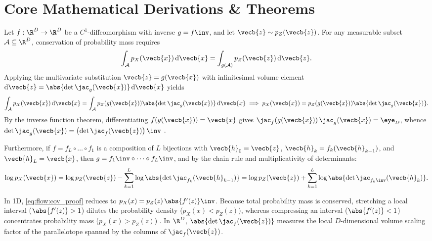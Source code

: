 \documentclass[../../../../master.tex]{subfiles}
\begin{document}
\section{Core Mathematical Derivations \& Theorems}\label{sec:flow:derivations}

\begin{coremath}
Let $f : \R^D \to \R^D$ be a $C^1$-diffeomorphism with inverse $g = f\inv$, and let $\vecb{z} \sim p_Z(\vecb{z})$. For any measurable subset $\mathcal{A} \subseteq \R^D$, conservation of probability mass requires
\begin{equation}\label{eq:flow:mass_conservation}
  \int_{\mathcal{A}} p_X(\vecb{x})\,\mathrm{d}\vecb{x} = \int_{g(\mathcal{A})} p_Z(\vecb{z})\,\mathrm{d}\vecb{z}.
\end{equation}
Applying the multivariate substitution $\vecb{z} = g(\vecb{x})$ with infinitesimal volume element $\mathrm{d}\vecb{z} = \abs{\det \jac_g(\vecb{x})}\,\mathrm{d}\vecb{x}$ yields
\begin{equation}\label{eq:flow:cov_proof}
  \int_{\mathcal{A}} p_X(\vecb{x})\,\mathrm{d}\vecb{x} = \int_{\mathcal{A}} p_Z(g(\vecb{x})) \abs{\det \jac_g(\vecb{x})}\,\mathrm{d}\vecb{x} \implies p_X(\vecb{x}) = p_Z(g(\vecb{x})) \abs{\det \jac_g(\vecb{x})}.
\end{equation}
By the inverse function theorem, differentiating $f(g(\vecb{x})) = \vecb{x}$ gives $\jac_f(g(\vecb{x}))\,\jac_g(\vecb{x}) = \eye_D$, whence $\det \jac_g(\vecb{x}) = \left(\det \jac_f(\vecb{z})\right)\inv$ .

Furthermore, if $f = f_L \circ \dots \circ f_1$ is a composition of $L$ bijections with $\vecb{h}_0 = \vecb{z}$, $\vecb{h}_k = f_k(\vecb{h}_{k-1})$, and $\vecb{h}_L = \vecb{x}$, then $g = f_1\inv \circ \dots \circ f_L\inv$, and by the chain rule and multiplicativity of determinants:
\begin{equation}\label{eq:flow:chain_rule}
  \log p_X(\vecb{x}) = \log p_Z(\vecb{z}) - \sum_{k=1}^L \log \abs{\det \jac_{f_k}(\vecb{h}_{k-1})} = \log p_Z(\vecb{z}) + \sum_{k=1}^L \log \abs{\det \jac_{f_k\inv}(\vecb{h}_k)}.
\end{equation}
\end{coremath}

\begin{intuition}
In 1D, \eqref{eq:flow:cov_proof} reduces to $p_X(x) = p_Z(z)\,\abs{f'(z)}\inv$. Because total probability mass is conserved, stretching a local interval ($\abs{f'(z)} > 1$) dilutes the probability density ($p_X(x) < p_Z(z)$), whereas compressing an interval ($\abs{f'(z)} < 1$) concentrates probability mass ($p_X(x) > p_Z(z)$) . In $\R^D$, $\abs{\det \jac_f(\vecb{z})}$ measures the local $D$-dimensional volume scaling factor of the parallelotope spanned by the columns of $\jac_f(\vecb{z})$.
\end{intuition}
\end{document}

